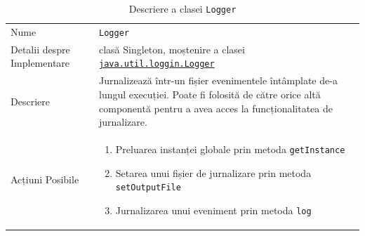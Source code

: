 \documentclass[12pt]{article}
\begin{document}
\begin{table}[H]
    \centering
    \begin{tabular}{ |p{0.25\linewidth} | p{0.75\linewidth}| } 
        \hline
        Nume & \texttt{Logger} \\
        Detalii despre Implementare & clasă Singleton, moștenire a clasei \href{https://docs.oracle.com/javase/7/docs/api/java/util/logging/Logger.html}{\texttt{java.util.loggin.Logger}} \\
        Descriere & Jurnalizează într-un fișier evenimentele întâmplate de-a lungul execuției. Poate fi folosită de către orice altă componentă pentru a avea acces la funcționalitatea de jurnalizare. \\
        Acțiuni Posibile & \begin{enumerate}
                               \item Preluarea instanței globale prin metoda \texttt{getInstance}
                               \item Setarea unui fișier de jurnalizare prin metoda \texttt{setOutputFile}
                               \item Jurnalizarea unui eveniment prin metoda \texttt{log}
                           \end{enumerate} \\
        \hline
    \end{tabular}
    \caption{Descriere a clasei \texttt{Logger}}
    \label{table:1}
\end{table}

\newpage
\end{document}
